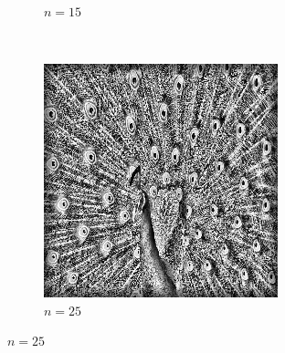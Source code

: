 \documentclass{article}
\begin{document}
\begin{enumerate}[label=(\alph*)]
\begin{figure}[!htb]
\begin{subfigure}[b]{0.3\textwidth}
            \caption{$n = 15$}
        \end{subfigure}
        ~
        \begin{subfigure}[b]{0.3\textwidth}
            \includegraphics[width=\textwidth]{img/L25.png}
            \caption{$n = 25$}
        \end{subfigure}
        
        

\end{figure}
\end{enumerate}
\end{document}
